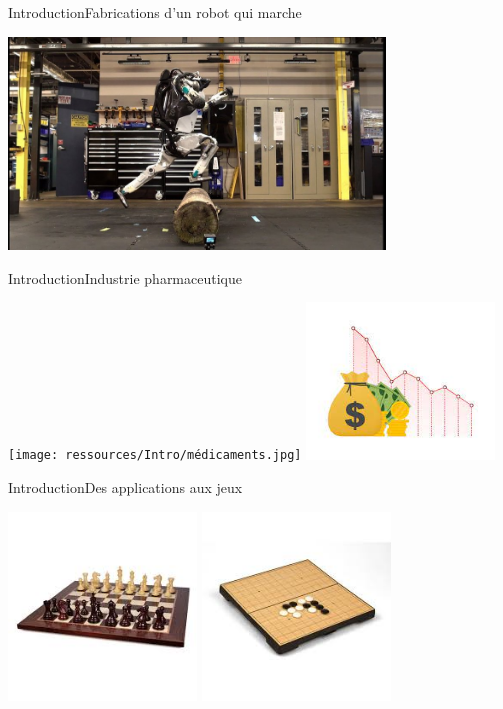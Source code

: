 \begin{frame}{Introduction}{Fabrications d'un robot qui marche}
   	\begin{center}
   		\includegraphics[width=10cm]{ressources/Intro/Robot saut.jpg}
   	\end{center}
\end{frame}
\begin{frame}{Introduction}{Industrie pharmaceutique}
	\begin{center}
		\texttt{[image: ressources/Intro/médicaments.jpg]}
		\includegraphics[width=5cm]{ressources/Intro/prix.jpg}
	\end{center}
\end{frame}
\begin{frame}{Introduction}{Des applications aux jeux}
	\begin{center}
		\includegraphics[width=5cm]{ressources/Intro/Echecs.jpg}
		\includegraphics[width=5cm]{ressources/Intro/GO.jpg}
	\end{center}
\end{frame}
